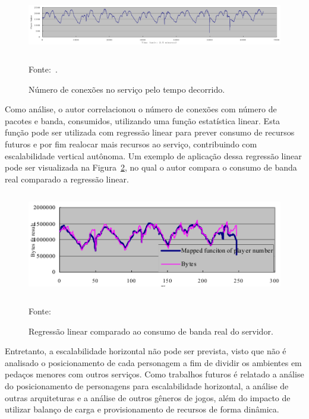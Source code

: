 \begin{figure}[htb!]
\caption{Número de conexões no serviço pelo tempo decorrido.}
\label{fig:players_peer_time}
\includegraphics[height=2.5cm]{img/cap2/players_peer_time.png}
\centering

Fonte:~\cite{1417630}.
\end{figure}



Como análise, o autor correlacionou o número de conexões com número de pacotes e banda, consumidos, utilizando uma função estatística linear.
%
Esta função pode ser utilizada com regressão linear para prever consumo de recursos futuros e por fim realocar mais recursos ao serviço, contribuindo com escalabilidade vertical autônoma.
%
Um exemplo de aplicação dessa regressão linear pode ser visualizada na Figura~\ref{fig:regressao_bytes}, no qual o autor compara o consumo de banda real comparado a regressão linear.



\begin{figure}[htb!]
\caption{Regressão linear comparado ao consumo de banda real do servidor.}
\label{fig:regressao_bytes}
\includegraphics[height=4.5cm]{img/cap2/regressao.png}
\centering

Fonte:~\cite{1417630}
\end{figure}



Entretanto, a escalabilidade horizontal não pode ser prevista, visto que não é analisado o posicionamento de cada personagem a fim de dividir os ambientes em pedaços menores com outros serviços.
%
Como trabalhos futuros é relatado a análise do posicionamento de personagens para escalabilidade horizontal, a análise de outras arquiteturas e a análise de outros gêneros de jogos, além do impacto de utilizar balanço de carga e provisionamento de recursos de forma dinâmica.



